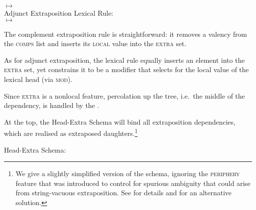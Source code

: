 \documentclass[output=paper
,notxmath 
 	        ,biblatex
                ,babelshorthands
                ,newtxmath
                ,draftmode
                ,colorlinks, citecolor=brown
]{langscibook}
\begin{document}
$\mapsto$ \\
\flushright {}
\z
\eas
Adjunct Extraposition Lexical Rule:\\
$\mapsto$ \\
\flushright{}
\zs


The complement extraposition rule is straightforward: it removes a
valency from the \textsc{comps} list and inserts its \textsc{local}
value into the \textsc{extra} set. 

As for adjunct extraposition, the lexical rule  equally inserts an
element into the \textsc{extra} set, yet constrains it to be a
modifier that selects for the local value of the lexical head (via
\textsc{mod}). 

Since \textsc{extra} is a nonlocal feature, percolation up the tree,
i.e.\ the middle of the dependency, is handled by the 
\citep[]{Pollard:Sag:94}.

At the top, the Head-Extra Schema will bind all extraposition
dependencies, which are realised as extraposed daughters.\footnote{We
  give a slightly simplified version of the schema, ignoring the
  \textsc{periphery} feature that was introduced to control for spurious
  ambiguity that could arise from string-vacuous extraposition. See
  \citet[--305]{Keller:95} for details and
  \citet{Crysmann2005a-u} for an alternative solution. }
\begin{exe}
  \ex Head-Extra Schema:

\end{exe}
\end{document}
